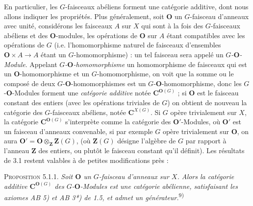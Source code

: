 \clearpage
{}

En particulier, les $G$-faisceaux abéliens forment une catégorie additive,
dont nous allons indiquer les propriétés.
Plus généralement, soit ${\mathbf O}$ un $G$-faisceau d'anneaux avec unité, considérons
les faisceaux $A$ sur $X$ qui sont à la fois des $G$-faisceaux abéliens et des
${\mathbf O}$-modules, les opérations de ${\mathbf O}$ sur $A$ étant compatibles avec les
opérations de $G$ (i.e. l'homomorphisme naturel de faisceaux d'ensembles
${\mathbf O}\times A\to A$ étant un $G$-homomorphisme) : un tel faisceau
sera appelé un \textit{$G$-${\mathbf O}$-Module}. Appelant
\textit{$G$-${\mathbf O}$-homomorphisme} un homomorphisme de faisceaux qui est un
${\mathbf O}$-homomorphisme et un $G$-homomorphisme, on voit que la somme ou le composé
de deux $G$-${\mathbf O}$-homomorphismes est un $G$-${\mathbf O}$-homomorphisme,
donc les $G$-${\mathbf O}$-Modules forment une \textit{catégorie additive} notée
${\mathbf C}^{{\mathbf O}(G)}$ ; si ${\mathbf O}$ est le faisceau constant des entiers (avec les opérations
triviales de $G$) on obtient de nouveau la catégorie des $G$-faisceaux
abéliens, notée ${\mathbf C}^{X(G)}$.
Si $G$ opère trivialement sur $X$, la catégorie ${\mathbf C}^{{\mathbf O}(G)}$ s'interprète comme
la catégorie des ${\mathbf O}'$-Modules, où ${\mathbf O}'$ est un faisceau d'anneaux convenable,
si par exemple $G$ opère trivialement sur ${\mathbf O}$, on aura
${\mathbf O}'={\mathbf O}\otimes_{\mathbf Z}\mathbf Z(G)$, (où $\mathbf Z(G)$ désigne l'algèbre
de $G$ par rapport à l'anneau $\mathbf Z$ des entiers, ou plutôt le faisceau
constant qu'il définit). Les résultats de 3.1 restent valables à de petites
modifications près :

\textsc{Proposition 5.1.1.} \textit{Soit ${\mathbf O}$ un $G$-faisceau
d'anneaux sur $X$. Alors la catégorie additive ${\mathbf C}^{{\mathbf O}(G)}$ des
$G$-${\mathbf O}$-Modules est une catégorie abélienne, satisfaisant les axiomes \textup{AB 5)}
et \textup{AB 3*)} de \textup{1.5}, et admet un générateur.}\textsuperscript{9)}

